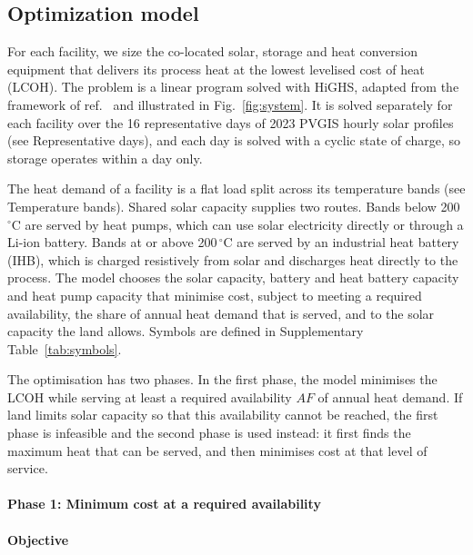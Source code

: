 \documentclass[11pt]{article}
\begin{document}
\subsection*{Optimization model}

For each facility, we size the co-located solar, storage and heat conversion equipment that delivers its process heat at the lowest levelised cost of heat (LCOH). The problem is a linear program solved with HiGHS, adapted from the framework of ref.~ and illustrated in Fig.~\ref{fig:system}. It is solved separately for each facility over the 16 representative days of 2023 PVGIS hourly solar profiles (see Representative days), and each day is solved with a cyclic state of charge, so storage operates within a day only.

The heat demand of a facility is a flat load split across its temperature bands (see Temperature bands). Shared solar capacity supplies two routes. Bands below 200\,$^\circ$C are served by heat pumps, which can use solar electricity directly or through a Li-ion battery. Bands at or above 200\,$^\circ$C are served by an industrial heat battery (IHB), which is charged resistively from solar and discharges heat directly to the process. The model chooses the solar capacity, battery and heat battery capacity and heat pump capacity that minimise cost, subject to meeting a required availability, the share of annual heat demand that is served, and to the solar capacity the land allows. Symbols are defined in Supplementary Table~\ref{tab:symbols}.

The optimisation has two phases. In the first phase, the model minimises the LCOH while serving at least a required availability $AF$ of annual heat demand. If land limits solar capacity so that this availability cannot be reached, the first phase is infeasible and the second phase is used instead: it first finds the maximum heat that can be served, and then minimises cost at that level of service.

\paragraph*{Phase 1: Minimum cost at a required availability}

\paragraph*{Objective}
\end{document}
